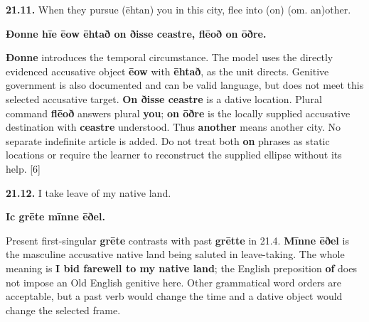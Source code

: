 \par\begin{minipage}{\linewidth}\raggedright
\textbf{21.11.} When they pursue (ēhtan) you in this city, flee into (on) (om. an)other.

\textbf{Ðonne hīe ēow ēhtað on ðisse ceastre, flēoð on ōðre.}

\textbf{Ðonne} introduces the temporal circumstance. The model uses the directly evidenced accusative object \textbf{ēow} with \textbf{ēhtað}, as the unit directs. Genitive government is also documented and can be valid language, but does not meet this selected accusative target. \textbf{On ðisse ceastre} is a dative location. Plural command \textbf{flēoð} answers plural \textbf{you}; \textbf{on ōðre} is the locally supplied accusative destination with \textbf{ceastre} understood. Thus \textbf{another} means another city. No separate indefinite article is added. Do not treat both \textbf{on} phrases as static locations or require the learner to reconstruct the supplied ellipse without its help. [6]

\end{minipage}\par\addvspace{4pt}

\par\begin{minipage}{\linewidth}\raggedright
\textbf{21.12.} I take leave of my native land.

\textbf{Ic grēte mīnne ēðel.}

Present first-singular \textbf{grēte} contrasts with past \textbf{grētte} in 21.4. \textbf{Mīnne ēðel} is the masculine accusative native land being saluted in leave-taking. The whole meaning is \textbf{I bid farewell to my native land}; the English preposition \textbf{of} does not impose an Old English genitive here. Other grammatical word orders are acceptable, but a past verb would change the time and a dative object would change the selected frame.

\end{minipage}\par\addvspace{4pt}

\clearpage
